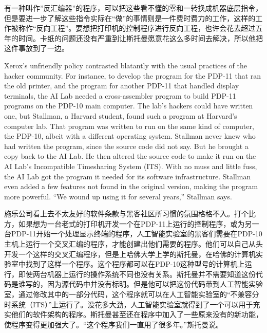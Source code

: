 \ifdefined\chs
有一种叫作''反汇编器''的程序，可以把这些看不懂的零和一转换成机器底层指令，但是要进一步了解这些指令实际在``做''的事情则是一件费时费力的工作，这样的工作被称作``反向工程''。要想把打印机的控制程序进行反向工程，也许会花去超过五年的时间。卡纸的问题还没有严重到让斯托曼愿意花这么多时间去解决，所以他把这件事放到了一边。
\fi

\ifdefined\eng
Xerox's unfriendly policy contrasted blatantly with the usual practices of the hacker community.  For instance, to develop the program for the PDP-11 that ran the old printer, and the program for another PDP-11 that handled display terminals, the AI Lab needed a cross-assembler program to build PDP-11 programs on the PDP-10 main computer. The lab's hackers could have written one, but Stallman, a Harvard student, found such a program at Harvard's computer lab. That program was written to run on the same kind of computer, the PDP-10, albeit with a different operating system. Stallman never knew who had written the program, since the source code did not say.  But he brought a copy back to the AI Lab. He then altered the source code to make it run on the AI Lab's Incompatible Timesharing System (ITS). With no muss and little fuss, the AI Lab got the program it needed for its software infrastructure. Stallman even added a few features not found in the original version, making the program more powerful. ``We wound up using it for several years,'' Stallman says.
\fi

\ifdefined\chs
施乐公司看上去不太友好的软件条款与黑客社区所习惯的氛围格格不入。打个比方，如果想为一台老式的打印机开发一个在PDP-11上运行的控制程序，或为另一台PDP-11开始一个处理显示终端的程序，人工智能实验室的黑客们需要在PDP-10主机上运行一个交叉汇编的程序，才能创建出他们需要的程序。他们可以自己从头开发一个这样的交叉汇编程序，但是上哈佛大学上学的斯托曼，在哈佛的计算机实验室中找到了这样一个程序。这个程序都可以在PDP-10这种型号的计算机上运行，即使两台机器上运行的操作系统不同也没有关系。斯托曼并不需要知道这份代码是谁写的，因为源代码中并没有标明。但是他可以把这份代码带到人工智能实验室，通过修改其中的一部分代码，这个程序就可以在人工智能实验室的``不兼容分时系统（ITS）''上运行了。没花多大劲，人工智能实验室就得到了一个可以用于充实他们的软件架构的程序。斯托曼甚至还在程序中加入了一些原来没有的新功能，使程序变得更加强大了。``这个程序我们一直用了很多年。''斯托曼说。
\fi
\fi

